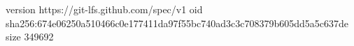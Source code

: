 version https://git-lfs.github.com/spec/v1
oid sha256:674e06250a510466c0e177411da97f55bc740ad3c3c708379b605dd5a5c637de
size 349692

